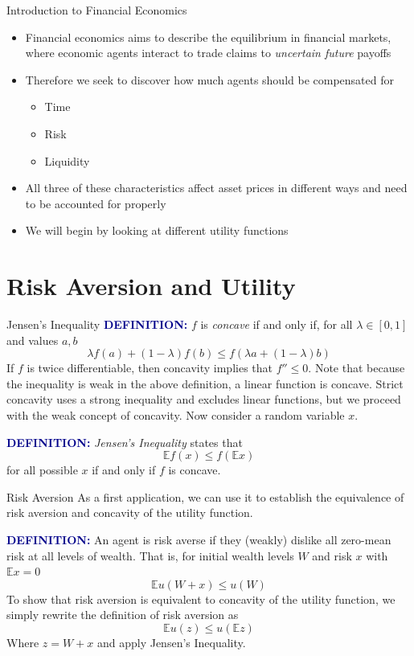 \documentclass[aspectratio=169,xcolor=dvipsnames]{beamer}
\begin{document}
\begin{frame}{Introduction to Financial Economics}
    \begin{itemize}
        \item Financial economics aims to describe the equilibrium in financial markets, where economic agents interact to trade claims to \emph{uncertain future} payoffs
        \item Therefore we seek to discover how much agents should be compensated for
        \begin{itemize}
            \item Time
            \item Risk
            \item Liquidity
        \end{itemize}
        \item All three of these characteristics affect asset prices in different ways and need to be accounted for properly
        \item We will begin by looking at different utility functions
    \end{itemize}
\end{frame}

\section{Risk Aversion and Utility}

\begin{frame}{Jensen's Inequality}
    \textcolor{darkblue}{\textbf{DEFINITION:}} $f$ is \emph{concave} if and only if, for all $\lambda \in [0,1]$ and values $a, b$
    \[
        \lambda f(a) + (1-\lambda) f(b) \le f(\lambda a + (1-\lambda) b)
    \]
    If $f$ is twice differentiable, then concavity implies that $f'' \le 0$. Note that because the inequality is weak in the above definition, a linear function is concave. Strict concavity uses a strong inequality and excludes linear functions, but we proceed with the weak concept of concavity. Now consider a random variable $x$.

    \textcolor{darkblue}{\textbf{DEFINITION:}} \emph{Jensen's Inequality} states that
    \[
        \mathbb{E} f(x) \le f(\mathbb{E} x)
    \]
    for all possible $x$ if and only if $f$ is concave.
\end{frame}

\begin{frame}{Risk Aversion}
    As a first application, we can use it to establish the equivalence of risk aversion and concavity of the utility function.

    \textcolor{darkblue}{\textbf{DEFINITION:}} An agent is risk averse if they (weakly) dislike all zero-mean risk at all levels of wealth. That is, for initial wealth levels $W$ and risk $x$ with $\mathbb{E} x = 0$
    \[
        \mathbb{E} u(W + x) \le u(W)
    \]
    To show that risk aversion is equivalent to concavity of the utility function, we simply rewrite the definition of risk aversion as
    \[
        \mathbb{E} u(z) \le u(\mathbb{E} z)
    \]
    Where $z = W + x$ and apply Jensen's Inequality.
\end{frame}
\end{document}
